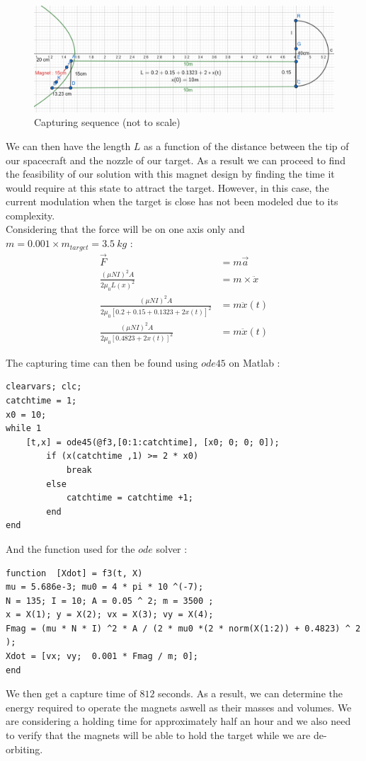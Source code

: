 \begin{figure}[H]
	\centering
	\includegraphics[width=\linewidth]{catching}
	\caption{Capturing sequence (not to scale)}
\end{figure}
We can then have the length $L$ as a function of the distance between the tip of our spacecraft and the nozzle of our target. As a result we can proceed to find the feasibility of our solution with this magnet design by finding the time it would require at this state to attract the target. However, in this case, the current modulation when the target is close has not been modeled due to its complexity.\\

Considering that the force will be on one axis only and $m = 0.001\times m_{target} = 3.5\ kg$ :
\begin{align}
\vec F &= m\vec a\\
\frac{(\mu NI)^2 A}{2\mu_0 L(x)^2} &= m \times \ddot x\\
\frac{(\mu NI)^2 A}{2\mu_0 [0.2 + 0.15 + 0.1323 + 2x(t)]^2} &= m \ddot x(t)\\
\frac{(\mu NI)^2 A}{2\mu_0 [0.4823 + 2x(t)]^2} &= m \ddot x(t)
\end{align}

The capturing time can then be found using $ode45$ on Matlab :
\begin{verbatim}
clearvars; clc;
catchtime = 1;
x0 = 10;
while 1
    [t,x] = ode45(@f3,[0:1:catchtime], [x0; 0; 0; 0]);
        if (x(catchtime ,1) >= 2 * x0)
            break
        else
            catchtime = catchtime +1;
        end
end
\end{verbatim}
And the function used for the $ode$ solver :
\begin{verbatim}
function  [Xdot] = f3(t, X)
mu = 5.686e-3; mu0 = 4 * pi * 10 ^(-7);
N = 135; I = 10; A = 0.05 ^ 2; m = 3500 ;
x = X(1); y = X(2); vx = X(3); vy = X(4);
Fmag = (mu * N * I) ^2 * A / (2 * mu0 *(2 * norm(X(1:2)) + 0.4823) ^ 2 );
Xdot = [vx; vy;  0.001 * Fmag / m; 0]; 
end
\end{verbatim}
We then get a capture time of $812$ seconds. As a result, we can determine the energy required to operate the magnets aswell as their masses and volumes. We are considering a holding time for approximately half an hour and we also need to verify that the magnets will be able to hold the target while we are de-orbiting.
